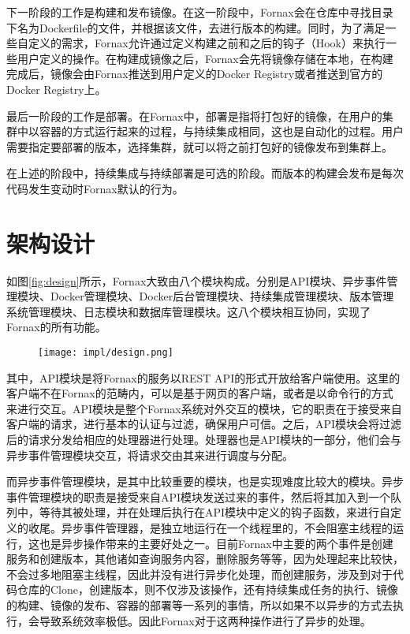 下一阶段的工作是构建和发布镜像。在这一阶段中，Fornax会在仓库中寻找目录下名为Dockerfile的文件，并根据该文件，去进行版本的构建。同时，为了满足一些自定义的需求，Fornax允许通过定义构建之前和之后的钩子（Hook）来执行一些用户定义的操作。在构建成镜像之后，Fornax会先将镜像存储在本地，在构建完成后，镜像会由Fornax推送到用户定义的Docker Registry或者推送到官方的Docker Registry上。

最后一阶段的工作是部署。在Fornax中，部署是指将打包好的镜像，在用户的集群中以容器的方式运行起来的过程，与持续集成相同，这也是自动化的过程。用户需要指定要部署的版本，选择集群，就可以将之前打包好的镜像发布到集群上。

在上述的阶段中，持续集成与持续部署是可选的阶段。而版本的构建会发布是每次代码发生变动时Fornax默认的行为。

\section{架构设计}


如图\ref{fig:design}所示，Fornax大致由八个模块构成。分别是API模块、异步事件管理模块、Docker管理模块、Docker后台管理模块、持续集成管理模块、版本管理系统管理模块、日志模块和数据库管理模块。这八个模块相互协同，实现了Fornax的所有功能。

\begin{figure}[!htp]
  \centering
  \texttt{[image: impl/design.png]}
\end{figure}

其中，API模块是将Fornax的服务以REST API的形式开放给客户端使用。这里的客户端不在Fornax的范畴内，可以是基于网页的客户端，或者是以命令行的方式来进行交互。API模块是整个Fornax系统对外交互的模块，它的职责在于接受来自客户端的请求，进行基本的认证与过滤，确保用户可信。之后，API模块会将过滤后的请求分发给相应的处理器进行处理。处理器也是API模块的一部分，他们会与异步事件管理模块交互，将请求交由其来进行调度与分配。

而异步事件管理模块，是其中比较重要的模块，也是实现难度比较大的模块。异步事件管理模块的职责是接受来自API模块发送过来的事件，然后将其加入到一个队列中，等待其被处理，并在处理后执行在API模块中定义的钩子函数，来进行自定义的收尾。异步事件管理器，是独立地运行在一个线程里的，不会阻塞主线程的运行，这也是异步操作带来的主要好处之一。目前Fornax中主要的两个事件是创建服务和创建版本，其他诸如查询服务内容，删除服务等等，因为处理起来比较快，不会过多地阻塞主线程，因此并没有进行异步化处理，而创建服务，涉及到对于代码仓库的Clone，创建版本，则不仅涉及该操作，还有持续集成任务的执行、镜像的构建、镜像的发布、容器的部署等一系列的事情，所以如果不以异步的方式去执行，会导致系统效率极低。因此Fornax对于这两种操作进行了异步的处理。

